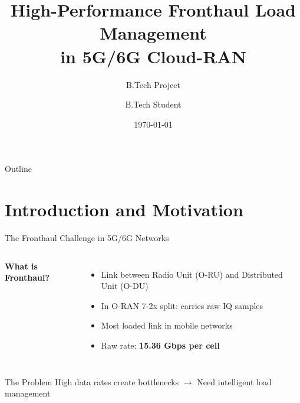 \documentclass[aspectratio=169]{beamer}
\title[Fronthaul Load Management]{High-Performance Fronthaul Load Management\\in 5G/6G Cloud-RAN}
\subtitle{B.Tech Project}
\author{B.Tech Student}
\institute{Department of Electrical Engineering\\Indian Institute of Technology}
\date{\today}
\begin{document}
\begin{frame}
\titlepage
\end{frame}

\begin{frame}{Outline}
\tableofcontents
\end{frame}

\section{Introduction and Motivation}

\begin{frame}{The Fronthaul Challenge in 5G/6G Networks}
\begin{columns}
\textbf{What is Fronthaul?}
\begin{itemize}
    \item Link between Radio Unit (O-RU) and Distributed Unit (O-DU)
    \item In O-RAN 7-2x split: carries raw IQ samples
    \item Most loaded link in mobile networks
    \item Raw rate: \textbf{15.36 Gbps per cell}
\end{itemize}

\end{columns}

\vspace{0.5cm}
\begin{block}{The Problem}
High data rates create bottlenecks $\rightarrow$ Need intelligent load management
\end{block}
\end{frame}
\end{document}
